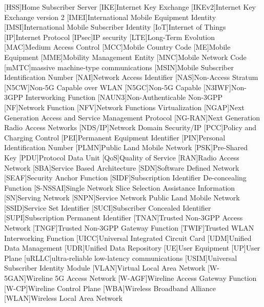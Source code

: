 \begin{acronym}[AAAAAA]
[HSS]{Home Subscriber Server}
[IKE]{Internet Key Exchange}
[IKEv2]{Internet Key Exchange version 2}
[IMEI]{International Mobile Equipment Identity}
[IMSI]{International Mobile Subscriber Identity}
[IoT]{Internet of Things}
[IP]{Internet Protocol}
[IPsec]{IP security}
[LTE]{Long-Term Evolution}
[MAC]{Medium Access Control}
[MCC]{Mobile Country Code}
[ME]{Mobile Equipment}
[MME]{Mobility Management Entity}
[MNC]{Mobile Network Code}
[mMTC]{massive machine-type communications}
[MSIN]{Mobile Subscriber Identification Number}
[NAI]{Network Access Identifier}
[NAS]{Non-Access Stratum}
[N5CW]{Non-5G Capable over WLAN}
[N5GC]{Non-5G Capable}
[N3IWF]{Non-3GPP Interworking Function}
[NAUN3]{Non-Authenticable Non-3GPP}
[NF]{Network Function}
[NFV]{Network Functions Virtualization}
[NGAP]{Next Generation Access and Service Management Protocol}
[NG-RAN]{Next Generation Radio Access Networks}
[NDS/IP]{Network Domain Security/IP}
[PCC]{Policy and Charging Control}
[PEI]{Permanent Equipment Identifier}
[PIN]{Personal Identification Number}
[PLMN]{Public Land Mobile Network}
[PSK]{Pre-Shared Key}
[PDU]{Protocol Data Unit}
[QoS]{Quality of Service}
[RAN]{Radio Access Network}
[SBA]{Service Based Architecture}
[SDN]{Software Defined Network}
[SEAF]{Security Anchor Function}
[SIDF]{Subscription Identifier De-concealing Function}
[S-NSSAI]{Single Network Slice Selection Assistance Information}
[SN]{Serving Network}
[SNPN]{Service Network Public Land Mobile Network}
[SSID]{Service Set Identifier}
[SUCI]{Subscriber Concealed Identifier}
[SUPI]{Subscription Permanent Identifier}
[TNAN]{Trusted Non-3GPP Access Network}
[TNGF]{Trusted Non-3GPP Gateway Function}
[TWIF]{Trusted WLAN Interworking Function}
[UICC]{Universal Integrated Circuit Card}
[UDM]{Unified Data Management}
[UDR]{Unified Data Repository}
[UE]{User Equipment}
[UP]{User Plane}
[uRLLC]{ultra-reliable low-latency communications}
[USIM]{Universal Subscriber Identity Module}
[VLAN]{Virtual Local Area Network}
[W-5GAN]{Wireline 5G Access Network}
[W-AGF]{Wireline Access Gateway Function}
[W-CP]{Wireline Control Plane}
[WBA]{Wireless Broadband Alliance}
[WLAN]{Wireless Local Area Network}
\end{acronym}
